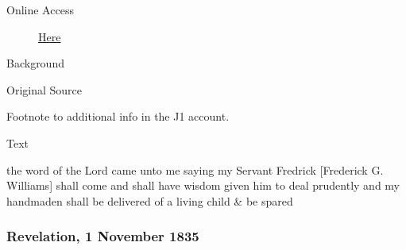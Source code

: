 			\begin{description}
				\item[Online Access] \href{https://www.josephsmithpapers.org/paper-summary/revelation-27-october-1835/1}{Here}
			\end{description}
			
			\begin{description}
				\item[Background]
			\end{description}
			
			
			\begin{description}
				\item[Original Source]
			\end{description}
			
				
				Footnote to additional info in the J1 account.
			
			\begin{description}
				\item[Text]
			\end{description}
			
				the word of the Lord came unto me saying my Servant Fredrick [Frederick G. Williams] shall come and shall have wisdom given him to deal prudently and my handmaden shall be delivered of a living child \& be spared
				
		\subsubsection{Revelation, 1 November 1835}
			\label{EMS-1835-JS-1-NOV-1835}
			
